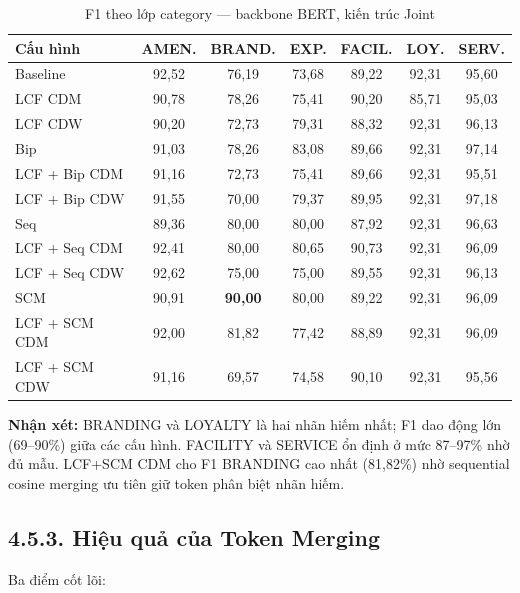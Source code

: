 \begin{table}[H]
\centering
\small
\caption{F1 theo lớp category — backbone BERT, kiến trúc Joint}
\label{tab:category_perclass}
\begin{tabular}{@{}lcccccc@{}}
\toprule
\textbf{Cấu hình} & \textbf{AMEN.} & \textbf{BRAND.} & \textbf{EXP.}
                  & \textbf{FACIL.} & \textbf{LOY.} & \textbf{SERV.} \\
\midrule
Baseline          & 92,52 & 76,19 & 73,68 & 89,22 & 92,31 & 95,60 \\
LCF CDM           & 90,78 & 78,26 & 75,41 & 90,20 & 85,71 & 95,03 \\
LCF CDW           & 90,20 & 72,73 & 79,31 & 88,32 & 92,31 & 96,13 \\
Bip               & 91,03 & 78,26 & 83,08 & 89,66 & 92,31 & 97,14 \\
LCF + Bip CDM     & 91,16 & 72,73 & 75,41 & 89,66 & 92,31 & 95,51 \\
LCF + Bip CDW     & 91,55 & 70,00 & 79,37 & 89,95 & 92,31 & 97,18 \\
Seq               & 89,36 & 80,00 & 80,00 & 87,92 & 92,31 & 96,63 \\
LCF + Seq CDM     & 92,41 & 80,00 & 80,65 & 90,73 & 92,31 & 96,09 \\
LCF + Seq CDW     & 92,62 & 75,00 & 75,00 & 89,55 & 92,31 & 96,13 \\
SCM              & 90,91 & \textbf{90,00} & 80,00 & 89,22 & 92,31 & 96,09 \\
LCF + SCM CDM    & 92,00 & 81,82 & 77,42 & 88,89 & 92,31 & 96,09 \\
LCF + SCM CDW    & 91,16 & 69,57 & 74,58 & 90,10 & 92,31 & 95,56 \\
\bottomrule
\end{tabular}
\end{table}

\textbf{Nhận xét:} BRANDING và LOYALTY là hai nhãn hiếm nhất; F1
dao động lớn (69--90\%) giữa các cấu hình. FACILITY và SERVICE ổn
định ở mức 87--97\% nhờ đủ mẫu. LCF+SCM CDM cho F1 BRANDING cao
nhất (81,82\%) nhờ sequential cosine merging ưu tiên giữ token phân biệt
nhãn hiếm.

\subsection{4.5.3.\; Hiệu quả của Token Merging}

Ba điểm cốt lõi:


